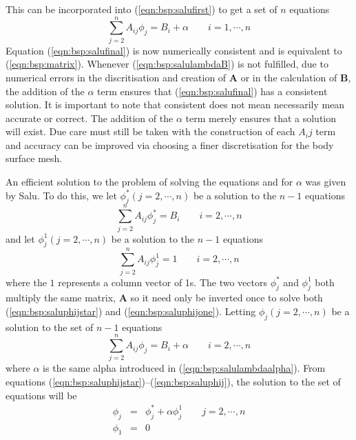 This can be incorporated into (\ref{eqn:bsp:salufirst}) to get a set of $n$
equations
\begin{equation}
\label{eqn:bsp:salufinal}
\sum_{j=2}^n A_{ij} \phi_j = B_i + \alpha \quad\quad  i = 1,\cdots, n
\end{equation}
Equation (\ref{eqn:bsp:salufinal}) is now numerically consistent and is
equivalent to (\ref{eqn:bsp:matrix}).
Whenever (\ref{eqn:bsp:salulambdaB}) is not fulfilled, due to numerical errors
in the discritisation and creation of $\textbf{A}$ or in the calculation of
$\textbf{B}$, the addition of the $\alpha$ term ensures that
(\ref{eqn:bsp:salufinal}) has a consistent solution.
It is important to note that consistent does not mean necessarily mean accurate
or correct.
The addition of the $\alpha$ term merely ensures that a solution will exist.
Due care must still be taken with the construction of each $A_ij$ term and
accuracy can be improved via choosing a finer discretisation for the body
surface mesh.

An efficient solution to the problem of solving the equations and for $\alpha$
was given by Salu.
To do this, we let $\phi_j^* \left(j=2,\cdots,n\right)$ be a solution to the
$n-1$ equations
\begin{equation}
\label{eqn:bsp:saluphijstar}
\sum_{j=2}^n A_{ij} \phi_j^* = B_i \quad\quad  i = 2,\cdots, n
\end{equation}
and let $\phi_j^1 \left(j=2,\cdots,n\right)$ be a solution to the $n-1$
equations
\begin{equation}
\label{eqn:bsp:saluphijone}
\sum_{j=2}^n A_{ij} \phi_j^1 = 1 \quad\quad  i = 2,\cdots, n
\end{equation}
where the $1$ represents a column vector of 1s.
The two vectors $\phi_j^*$ and $\phi_j^1$ both multiply the same matrix,
$\mathbf{A}$ so it need only be inverted once to solve both
(\ref{eqn:bsp:saluphijstar}) and (\ref{eqn:bsp:saluphijone}).
Letting $\phi_j \left(j=2,\cdots,n\right)$ be a solution to the set of $n-1$
equations
\begin{equation}
\label{eqn:bsp:saluphij}
\sum_{j=2}^n A_{ij} \phi_j = B_i + \alpha \quad\quad  i = 2,\cdots, n
\end{equation}
where $\alpha$ is the same alpha introduced in (\ref{eqn:bsp:salulambdaalpha}).
From equations (\ref{eqn:bsp:saluphijstar})--(\ref{eqn:bsp:saluphij}), the
solution to the set of equations will be
\begin{eqnarray}
\label{eqn:bsp:salusolution}
\phi_j&=&\phi_j^* + \alpha\phi_j^1 \quad\quad  j = 2,\cdots, n \nonumber\\
\phi_1&=&0
\end{eqnarray}

